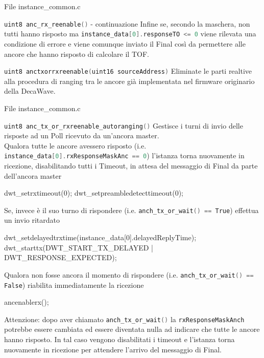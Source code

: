 \begin{frame}{File instance\_common.c}
  \begin{block}{\lstinline[language=C]!uint8 anc_rx_reenable()! - continuazione \newfunction}
    Infine se, secondo la maschera, non tutti hanno risposto ma \lstinline[language=C]!instance_data[0].responseTO <= 0! viene
    rilevata una condizione di errore e viene comunque inviato il Final così da permettere alle ancore che hanno risposto di calcolare il TOF.
  \end{block}
  \begin{block}{\lstinline[language=C]!uint8 anctxorrxreenable(uint16 sourceAddress)! \oldfunction}
    Eliminate le parti realtive alla procedura di ranging tra le ancore già implementata nel firmware originario della DecaWave.
  \end{block}
\end{frame}

\begin{frame}[fragile,shrink=30]{File instance\_common.c}
  \begin{block}{\lstinline[language=C]!uint8 anc_tx_or_rxreenable_autoranging()! \newfunction}
    Gestisce i turni di invio delle risposte ad un Poll ricevuto da un'ancora master.\\
    Qualora tutte le ancore avessero risposto (i.e. \lstinline[language=C]!instance_data[0].rxResponseMaskAnc == 0!) l'istanza torna nuovamente in ricezione, disabilitando tutti i
    Timeout, in attesa del messaggio di Final da parte dell'ancora master 
    \begin{C}
      dwt_setrxtimeout(0);
      dwt_setpreambledetecttimeout(0);
    \end{C}
    Se, invece è il suo turno di rispondere (i.e. \lstinline[language=C]!anch_tx_or_wait() == True!) effettua un invio ritardato
    \begin{C}
      dwt_setdelayedtrxtime(instance_data[0].delayedReplyTime);
      dwt_starttx(DWT_START_TX_DELAYED | DWT_RESPONSE_EXPECTED);
    \end{C}
    Qualora non fosse ancora il momento di rispondere (i.e. \lstinline[language=C]!anch_tx_or_wait() == False!) riabilita immediatamente la ricezione
    \begin{C}
      ancenablerx();
    \end{C}    
    \textcolor{dgreen}{Attenzione:} dopo aver chiamato \lstinline[language=C]!anch_tx_or_wait()! la \lstinline[language=C]!rxResponseMaskAnch! potrebbe essere cambiata ed essere diventata
    nulla ad indicare che tutte le ancore hanno risposto. In tal caso vengono disabilitati i timeout e l'istanza torna nuovamente in ricezione per attendere l'arrivo del messaggio di Final.
  \end{block}
\end{frame}


